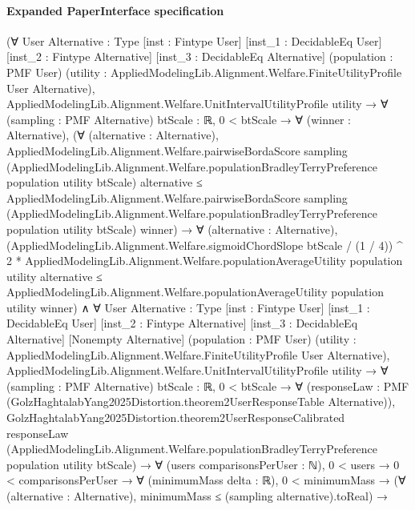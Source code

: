 \documentclass[10pt]{article}
\begin{document}
\paragraph{Expanded PaperInterface specification}
\begin{ReviewVerbatim}
(∀ {User Alternative : Type} [inst : Fintype User] [inst_1 : DecidableEq User] [inst_2 : Fintype Alternative]
    [inst_3 : DecidableEq Alternative] (population : PMF User)
    (utility : AppliedModelingLib.Alignment.Welfare.FiniteUtilityProfile User Alternative),
    AppliedModelingLib.Alignment.Welfare.UnitIntervalUtilityProfile utility →
      ∀ (sampling : PMF Alternative) {btScale : ℝ},
        0 < btScale →
          ∀ (winner : Alternative),
            (∀ (alternative : Alternative),
                AppliedModelingLib.Alignment.Welfare.pairwiseBordaScore sampling
                    (AppliedModelingLib.Alignment.Welfare.populationBradleyTerryPreference population utility btScale)
                    alternative ≤
                  AppliedModelingLib.Alignment.Welfare.pairwiseBordaScore sampling
                    (AppliedModelingLib.Alignment.Welfare.populationBradleyTerryPreference population utility btScale)
                    winner) →
              ∀ (alternative : Alternative),
                (AppliedModelingLib.Alignment.Welfare.sigmoidChordSlope btScale / (1 / 4)) ^ 2 *
                    AppliedModelingLib.Alignment.Welfare.populationAverageUtility population utility alternative ≤
                  AppliedModelingLib.Alignment.Welfare.populationAverageUtility population utility winner) ∧
  ∀ {User Alternative : Type} [inst : Fintype User] [inst_1 : DecidableEq User] [inst_2 : Fintype Alternative]
    [inst_3 : DecidableEq Alternative] [Nonempty Alternative] (population : PMF User)
    (utility : AppliedModelingLib.Alignment.Welfare.FiniteUtilityProfile User Alternative),
    AppliedModelingLib.Alignment.Welfare.UnitIntervalUtilityProfile utility →
      ∀ (sampling : PMF Alternative) {btScale : ℝ},
        0 < btScale →
          ∀ (responseLaw : PMF (GolzHaghtalabYang2025Distortion.theorem2UserResponseTable Alternative)),
            GolzHaghtalabYang2025Distortion.theorem2UserResponseCalibrated responseLaw
                (AppliedModelingLib.Alignment.Welfare.populationBradleyTerryPreference population utility btScale) →
              ∀ (users comparisonsPerUser : ℕ),
                0 < users →
                  0 < comparisonsPerUser →
                    ∀ (minimumMass delta : ℝ),
                      0 < minimumMass →
                        (∀ (alternative : Alternative), minimumMass ≤ (sampling alternative).toReal) →

\end{ReviewVerbatim}
\end{document}
